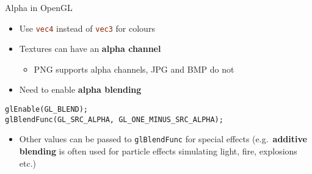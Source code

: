 \begin{frame}[fragile]{Alpha in OpenGL}
	\begin{itemize}
		\item Use \lstinline[language=GLSL]{vec4} instead of \lstinline[language=GLSL]{vec3} for colours
		\pause\item Textures can have an \textbf{alpha channel}
			\begin{itemize}
				\pause\item PNG supports alpha channels, JPG and BMP do not
			\end{itemize}
		\pause\item Need to enable \textbf{alpha blending}
	\end{itemize}
	\pause
	\begin{lstlisting}
glEnable(GL_BLEND);
glBlendFunc(GL_SRC_ALPHA, GL_ONE_MINUS_SRC_ALPHA);
	\end{lstlisting}
	\begin{itemize}	
		\item Other values can be passed to \lstinline{glBlendFunc} for special effects
			(e.g.\ \textbf{additive blending} is often used for particle effects simulating
				light, fire, explosions etc.)
	\end{itemize}
\end{frame}
